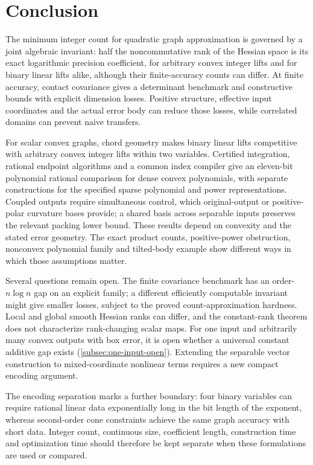 \section{Conclusion}\label{sec:conclusion}

The minimum integer count for quadratic graph approximation is governed
by a joint algebraic invariant: half the noncommutative rank of the
Hessian space is its exact logarithmic precision coefficient, for
arbitrary convex integer lifts and for binary linear lifts alike, although
their finite-accuracy counts can differ. At finite accuracy, contact
covariance gives a determinant benchmark and constructive bounds with
explicit dimension losses. Positive structure, effective input
coordinates and the actual error body can reduce those losses, while
correlated domains can prevent naive transfers.

For scalar convex graphs, chord geometry makes binary linear lifts
competitive with arbitrary convex integer lifts within two variables.
Certified integration, rational endpoint algorithms and a common index
compiler give an eleven-bit polynomial rational comparison for dense
convex polynomials, with separate constructions for the specified sparse
polynomial and power representations. Coupled outputs require
simultaneous control, which original-output or positive-polar curvature
bases provide; a shared basis across separable inputs preserves the
relevant packing lower bound. These results depend on convexity and the
stated error geometry. The exact product counts, positive-power
obstruction, nonconvex polynomial family and tilted-body example show
different ways in which those assumptions matter.

Several questions remain open. The finite covariance benchmark has an
order-$n\log n$ gap on an explicit family; a different efficiently
computable invariant might give smaller losses, subject to the proved
count-approximation hardness. Local and global smooth Hessian ranks can
differ, and the constant-rank theorem does not characterize rank-changing
scalar maps. For one input and arbitrarily many convex outputs with box
error, it is open whether a universal constant additive gap exists
(\cref{subsec:one-input-open}). Extending the separable vector construction to
mixed-coordinate nonlinear terms requires a new compact encoding
argument.

The encoding separation marks a further boundary: four binary variables
can require rational linear data exponentially long in the bit length of
the exponent, whereas second-order cone constraints achieve the same
graph accuracy with short data. Integer count, continuous size,
coefficient length, construction time and optimization time should
therefore be kept separate when these formulations are used or compared.
